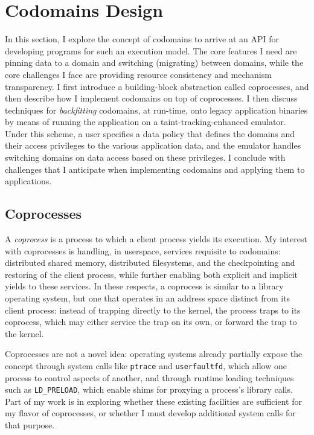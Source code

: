 \section{Codomains Design}
\label{sec:codomains-design}

In this section, I explore the concept of codomains to arrive at an
API for developing programs for such an execution model.
%
The core features I need are pinning data to a domain and switching
(migrating) between domains, while the core challenges I face are providing
resource consistency and mechanism transparency.
%
I first introduce a building-block abstraction called coprocesses, and then
describe how I implement codomains on top of coprocesses.
%
I then discuss techniques for \emph{backfitting} codomains, at run-time, onto legacy
application binaries by means of running the application on a
taint-tracking-enhanced emulator.
%
Under this scheme, a user specifies a data policy that defines the domains and
their access privileges to the various application data, and the emulator
handles switching domains on data access based on these privileges.
%
I conclude with challenges that I anticipate when implementing codomains and
applying them to applications.


\subsection{Coprocesses}

A \emph{coprocess} is a process to which a client process yields its
execution.
%
My interest with coprocesses is handling, in userspace, services requisite to
codomains: distributed shared memory, distributed filesystems, and the
checkpointing and restoring of the client process, while further enabling both
explicit and implicit yields to these services.
%
In these respects, a coprocess is similar to a library operating system, but
one that operates in an address space distinct from its client process: instead of
trapping directly to the kernel, the process traps to its coprocess, which may
either service the trap on its own, or forward the trap to the kernel.


Coprocesses are not a novel idea: operating systems already partially expose the
concept through system calls like \texttt{ptrace} and
\texttt{userfaultfd}, which allow one process to control aspects of another,
and through runtime loading techniques such as \texttt{LD\_PRELOAD}, which
enable shims for proxying a process's library calls.
%
Part of my work is in exploring whether these existing facilities are
sufficient for my flavor of coprocesses, or whether I must develop additional
system calls for that purpose.



